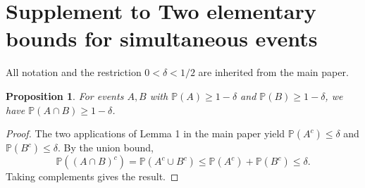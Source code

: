 \documentclass{article}
\newtheorem{proposition}{Proposition}
\begin{document}
\section*{Supplement to Two elementary bounds for simultaneous events}
All notation and the restriction $0<\delta<1/2$ are inherited from the main paper.
\setcounter{proposition}{6}
\begin{proposition}\label{prop:joint-supp}
For events $A,B$ with $\mathbb P(A)\ge1-\delta$ and
$\mathbb P(B)\ge1-\delta$, we have $\mathbb P(A\cap B)\ge1-\delta$.
\end{proposition}
\begin{proof}
The two applications of Lemma 1 in the main paper yield
$\mathbb P(A^c)\le\delta$ and $\mathbb P(B^c)\le\delta$.
By the union bound,
\[
\mathbb P((A\cap B)^c)=\mathbb P(A^c\cup B^c)
\le\mathbb P(A^c)+\mathbb P(B^c)\le\delta.
\]
Taking complements gives the result.
\end{proof}
\end{document}
